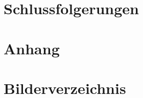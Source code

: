 \documentclass[12pt,a4paper]{article} %
\begin{document}



\section{Schlussfolgerungen}
\newpage




\appendix
\section{Anhang}
\newpage





\section{Bilderverzeichnis}
\listoffigures



\newpage

\printbibliography
\end{document}
